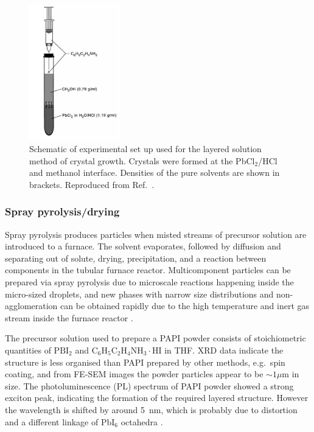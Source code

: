 \begin{figure}[ht]
\centering
\includegraphics[width=0.35\textwidth]{Fig5}
\caption{Schematic of experimental set up used for the layered solution method of crystal growth. Crystals were formed at the Pb$\textrm{Cl}_2$/HCl and methanol interface. Densities of the pure solvents are shown in brackets. Reproduced from Ref.\ \cite{Mitzi1999b}.}
\label{2Fig5}
\end{figure}

\subsubsection {Spray pyrolysis/drying}
Spray pyrolysis produces particles when misted streams of precursor solution are introduced to a furnace. The solvent evaporates, followed by diffusion and separating out of solute, drying, precipitation, and a reaction between components in the tubular furnace reactor. Multicomponent particles can be prepared via spray pyrolysis due to microscale reactions happening inside the micro-sized droplets, and new phases with narrow size distributions and non-agglomeration can be obtained rapidly due to the high temperature and inert gas stream inside the furnace reactor \cite{Cheng2005}. 

The precursor solution used to prepare a PAPI powder consists of stoichiometric quantities of $\textrm{PBI}_2$ and $\textrm{C}_6\textrm{H}_5\textrm{C}_2\textrm{H}_4\textrm{NH}_3\cdot\textrm{HI}$ in THF.  XRD data indicate the structure is less organised than PAPI prepared by other methods, e.g.\ spin coating, and from FE-SEM images the powder particles appear to be $\sim 1 \mu$m in size. The photoluminescence (PL) spectrum of PAPI powder showed a strong exciton peak, indicating the formation of the required layered structure. However the wavelength is shifted by around 5~nm, which is probably due to distortion and a different linkage of $\textrm{PbI}_6$ octahedra \cite{Cheng2005}.

